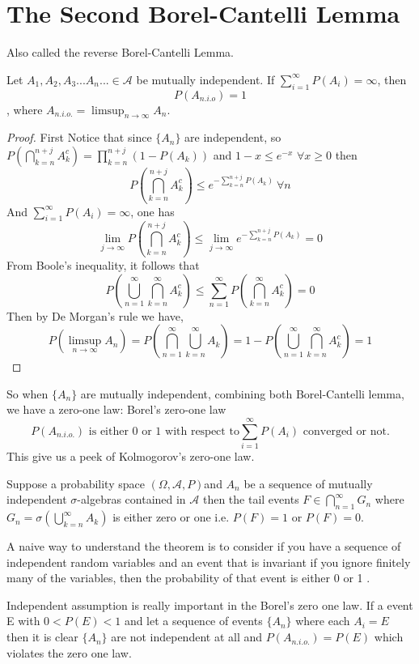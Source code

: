 \documentclass[../Probability_Theory.tex]{subfiles}
\begin{document}
\section{The Second Borel-Cantelli Lemma}
Also called the reverse Borel-Cantelli Lemma.
\begin{theorem}
Let $A_1,A_2,A_3...A_n...\in \mathcal{A}$ be mutually independent. If $\sum_{i=1}^{\infty}P(A_i)=\infty$, then	$$P(A_{n.i.o}) = 1$$
	, where $A_{n.i.o.} = \limsup_{n\rightarrow\infty}A_n.$
\end{theorem}
\begin{proof}
First Notice that since $\{A_n\}$ are independent, so $P(\bigcap_{k=n}^{n+j}A_k^c)=\prod_{k=n}^{n+j}(1-P(A_k))$ and $1-x\leq e^{-x}$ $\forall x\geq 0$ then $$P(\bigcap_{k=n}^{n+j}A_k^c)\leq e^{-\sum_{k=n}^{n+j}P(A_k)} \ \forall n$$
And $\sum_{i=1}^{\infty}P(A_i)=\infty$, one has 
$$\lim_{j\rightarrow\infty}P(\bigcap_{k=n}^{n+j}A_k^c)\leq \lim_{j\rightarrow\infty}e^{-\sum_{k=n}^{n+j}P(A_k)}=0$$ From Boole's inequality, it follows that $$P(\bigcup_{n=1}^\infty\bigcap_{k=n}^\infty A_k^c)\leq \sum_{n=1}^\infty P(\bigcap_{k=n}^\infty A_k^c)=0$$Then by De Morgan's rule we have,
$$P(\limsup_{n\rightarrow\infty}A_n)=P(\bigcap_{n=1}^\infty\bigcup_{k=n}^\infty A_k)=1-P(\bigcup_{n=1}^\infty\bigcap_{k=n}^\infty A_k^c)=1$$
\end{proof}
So when $\{A_n\}$ are mutually independent, combining both Borel-Cantelli lemma, we have a zero-one law: Borel's zero-one law
$$P(A_{n.i.o.})\text{ is either 0 or 1 with respect to} \sum_{i=1}^{\infty}P(A_i) \text{ converged or not}. 
$$
This give us a peek of Kolmogorov's zero-one law.
\begin{theorem}
Suppose a probability space $(\Omega,\mathcal{A},P)$and $A_n$ be a sequence of mutually independent $\sigma$-algebras contained in $\mathcal{A}$  then the tail events $F\in \bigcap_{n=1}^{\infty}G_n$ where $G_n=\sigma(\bigcup_{k=n}^\infty A_k)$ is either zero or one i.e. $P(F)=1$ or $P(F)=0$.
\end{theorem}
\begin{remark}
A naive way to understand the theorem is to consider if you have a sequence of independent random variables and an event that is invariant if you ignore finitely many of the variables, then the probability of that event is either 0 or 1 .
\end{remark}
\begin{remark}
Independent assumption is really important in the Borel's zero one law. If a event E with $0<P(E)<1$ and let a sequence of events $\{A_n\}$ where each $A_i=E$ then it is clear  $\{A_n\}$ are not independent at all and $P(A_{n.i.o.})=P(E)$ which violates the zero one law.
\end{remark}
\end{document}
